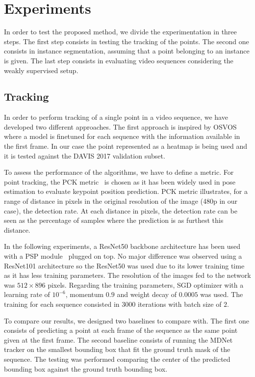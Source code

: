 
\section{Experiments}

In order to test the proposed method, we divide the experimentation in three steps.
The first step consists in testing the tracking of the points.
The second one consists in instance segmentation, assuming that a point belonging to an instance is given.
The last step consists in evaluating video sequences considering the weakly supervised setup.

\subsection{Tracking}

In order to perform tracking of a single point in a video sequence, we have developed two different approaches.
The first approach is inspired by OSVOS~\osvos{} where a model is finetuned for each sequence with the information available in the first frame.
In our case the point represented as a heatmap is being used and it is tested against the DAVIS 2017 validation subset.

To assess the performance of the algorithms, we have to define a metric.
For point tracking, the PCK metric~\pckmetric{} is chosen as it has been widely used in pose estimation to evaluate keypoint position prediction.
PCK metric illustrates, for a range of distance in pixels in the original resolution of the image (480p in our case), the detection rate.
At each distance in pixels, the detection rate can be seen as the percentage of samples where the prediction is as furthest this distance. %

In the following experiments, a ResNet50 backbone architecture has been used with a PSP module~\pspnet{} plugged on top.
No major difference was observed using a ResNet101 architecture so the ResNet50 was used due to its lower training time as it has less training parameters.
The resolution of the images fed to the network was $512 \times 896$ pixels.
Regarding the training parameters, SGD optimizer with a learning rate of $10^{-6}$, momentum $0.9$ and weight decay of $0.0005$ was used. The training for each sequence consisted in 3000 iterations with batch size of $2$.

To compare our results, we designed two baselines to compare with.
The first one consists of predicting a point at each frame of the sequence as the same point given at the first frame.
The second baseline consists of running the MDNet~\mdnet{} tracker on the smallest bounding box that fit the ground truth mask of the sequence.
The testing was performed comparing the center of the predicted bounding box against the ground truth bounding box.

